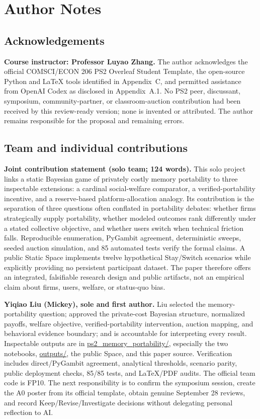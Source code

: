 \clearpage\nobalance
\section*{Author Notes}
\subsection*{Acknowledgements}
\textbf{Course instructor: Professor Luyao Zhang.} The author acknowledges the official COMSCI/ECON 206 PS2 Overleaf Student Template, the open-source Python and LaTeX tools identified in Appendix~C, and permitted assistance from OpenAI Codex as disclosed in Appendix~A.1. No PS2 peer, discussant, symposium, community-partner, or classroom-auction contribution had been received by this review-ready version; none is invented or attributed. The author remains responsible for the proposal and remaining errors.

\subsection*{Team and individual contributions}
\textbf{Joint contribution statement (solo team; 124 words).} This solo project links a static Bayesian game of privately costly memory portability to three inspectable extensions: a cardinal social-welfare comparator, a verified-portability incentive, and a reserve-based platform-allocation analogy. Its contribution is the separation of three questions often conflated in portability debates: whether firms strategically supply portability, whether modeled outcomes rank differently under a stated collective objective, and whether users switch when technical friction falls. Reproducible enumeration, PyGambit agreement, deterministic sweeps, seeded auction simulation, and 85 automated tests verify the formal claims. A public Static Space implements twelve hypothetical Stay/Switch scenarios while explicitly providing no persistent participant dataset. The paper therefore offers an integrated, falsifiable research design and public artifacts, not an empirical claim about firms, users, welfare, or status-quo bias.

\textbf{Yiqiao Liu (Mickey), sole and first author.} Liu selected the memory-portability question; approved the private-cost Bayesian structure, normalized payoffs, welfare objective, verified-portability intervention, auction mapping, and behavioral evidence boundary; and is accountable for interpreting every result. Inspectable outputs are in \url{ps2_memory_portability/}, especially the two notebooks, \url{outputs/}, the public Space, and this paper source. Verification includes direct/PyGambit agreement, analytical thresholds, scenario parity, public deployment checks, 85/85 tests, and LaTeX/PDF audits. The official team code is FP10. The next responsibility is to confirm the symposium session, create the A0 poster from its official template, obtain genuine September 28 reviews, and record Keep/Revise/Investigate decisions without delegating personal reflection to AI.

